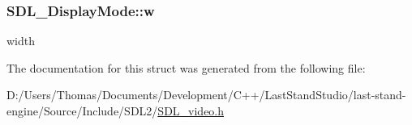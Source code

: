 \subsubsection[{w}]{ S\+D\+L\+\_\+\+Display\+Mode\+::w}\label{structSDL__DisplayMode_a504bb5e21950b719a0df43be51199046}
width 

The documentation for this struct was generated from the following file\+:\begin{DoxyCompactItemize}
\item 
D\+:/\+Users/\+Thomas/\+Documents/\+Development/\+C++/\+Last\+Stand\+Studio/last-\/stand-\/engine/\+Source/\+Include/\+S\+D\+L2/\hyperlink{SDL__video_8h}{S\+D\+L\+\_\+video.\+h}\end{DoxyCompactItemize}
